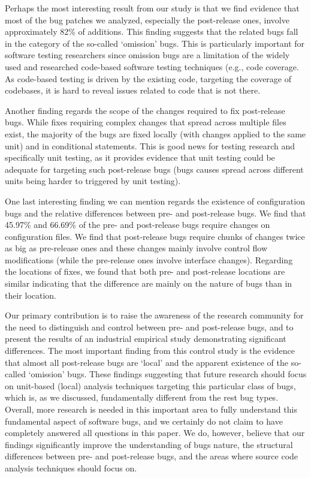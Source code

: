 \documentclass[conference]{IEEEtran}
\begin{document}
Perhaps the most interesting result from our study is that we find evidence that most of the bug patches we analyzed, especially the post-release ones, involve approximately 82\% of additions. This finding suggests that the related bugs fall in the category of the so-called `omission' bugs. This is particularly important for software testing researchers since omission bugs are a limitation of the widely used and researched code-based software testing techniques (e.g., code coverage. As code-based testing is driven by the existing code, targeting the coverage of codebases, it is hard to reveal issues related to code that is not there. 

Another finding regards the scope of the changes required to fix post-release bugs. While fixes requiring complex changes that spread across multiple files exist, the majority of the bugs are fixed locally (with changes applied to the same unit) and in conditional statements. This is good news for testing research and specifically unit testing, as it provides evidence that unit testing could be adequate for targeting such post-release bugs (bugs causes spread across different units being harder to triggered by unit testing). 

One last interesting finding  we can mention regards the existence of configuration bugs and the relative differences between pre- and post-release bugs. We find that 45.97\% and 66.69\% of the pre- and post-release bugs require changes on configuration files. We find that post-release bugs require  chunks of changes twice as big as pre-release ones and these changes mainly involve control flow modifications (while the pre-release ones involve interface changes). Regarding the locations of fixes, we found that both pre- and post-release locations are similar indicating that the difference are mainly on the nature of bugs than in their location. 

Our primary contribution is to raise the awareness of the research community for the need to distinguish and control between pre- and post-release bugs, and to present the results of an industrial empirical study demonstrating significant differences. The most important finding from this control study is the evidence that almost all post-release bugs are `local' and the apparent existence of the so-called `omission' bugs. These findings suggesting that future research should focus on unit-based (local) analysis techniques targeting this particular class of bugs, which is, as we discussed, fundamentally different from the rest bug types. Overall, more research is needed in this important area to fully understand this fundamental aspect of software bugs, and we certainly do not claim to have completely answered all questions in this paper. We do, however, believe that our findings significantly improve the understanding of bugs nature, the structural differences between pre- and post-release bugs, and the areas where source code analysis techniques should focus on. 
\end{document}
